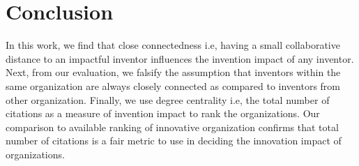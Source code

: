 \section{Conclusion}
In this work, we find that close connectedness i.e, having a small collaborative distance
 to an impactful inventor  influences the
invention impact of any inventor. Next, from our evaluation, we falsify the assumption that 
 inventors within the same organization are always closely connected as compared to
inventors from other organization. Finally, we use degree centrality i.e, the total number of citations 
as a measure of invention impact to rank the organizations. Our comparison to
available ranking of innovative organization confirms that 
total number of citations is a fair metric to use in deciding the innovation impact of organizations.

